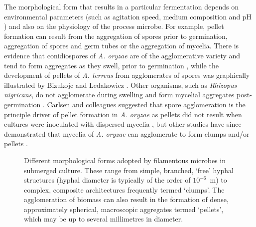 The morphological form that results in a particular fermentation depends on environmental parameters (such as agitation speed, medium composition and pH \cite{papagiannireview}) and also on the physiology of the process microbe. For example, pellet formation can result from the aggregation of spores prior to germination, aggregation of spores and germ tubes or the aggregation of mycelia. There is evidence that conidiospores of \emph{A. oryzae} are of the agglomerative variety and tend to form aggregates as they swell, prior to germination \cite{carlsen1996a}, while the development of pellets of \emph{A. terreus} from agglomerates of spores was graphically illustrated by Bizukojc and Ledakowicz \cite{bizukojc2009}. Other organisms, such as \emph{Rhizopus nigricans}, do not agglomerate during swelling and form mycelial aggregates post-germination \cite{znidarsic1998}. Carlsen and colleagues suggested that spore agglomeration is the principle driver of pellet formation in \emph{A. oryzae} as pellets did not result when cultures were inoculated with dispersed mycelia \cite{carlsen1996a}, but other studies have since demonstrated that mycelia of \emph{A. oryzae} can agglomerate to form clumps and/or pellets \cite{amanullah2001,muller2003}.

\begin{figure}[tb]
	\centering
	\hspace{0.5cm}
	\hspace{0.5cm}
	\caption{Different morphological forms adopted by filamentous microbes in submerged culture. These range from simple, branched, \lq free' hyphal structures (hyphal diameter is typically of the order of $10^{-6}$~m) to complex, composite architectures frequently termed \lq clumps'. The agglomeration of biomass can also result in the formation of dense, approximately spherical, macroscopic aggregates termed \lq pellets', which may be up to several millimetres in diameter.}
	\label{fig:SubMorph}
\end{figure}

